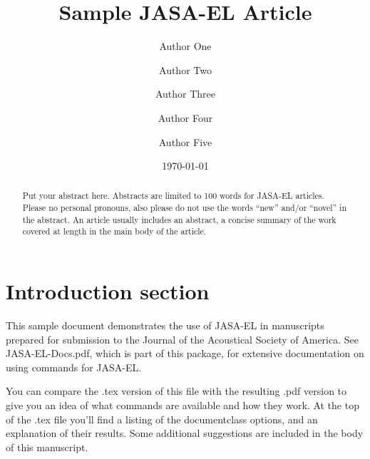 \documentclass{JASA-EL}
\begin{document}
\title[JASA-EL/Sample JASA-EL Article]{Sample JASA-EL Article}
\author{Author One}
\author{Author Two}
\author{Author Three}
\author{Author Four}
\correspondingauthor
{}
\author{Author Five}			

\date{\today} 

\begin{abstract}
Put your abstract here. Abstracts are limited to 100 words for
JASA-EL
articles. Please no
personal pronouns, also please do not use the words ``new'' and/or
``novel'' in the abstract. An article usually includes an abstract, a
concise summary of the work covered at length in the main body of the
article.     
\end{abstract}


\maketitle


\section{\label{sec:1} Introduction section}
This sample document demonstrates the use of JASA-EL in manuscripts 
prepared for submission to the Journal of the Acoustical Society of America.  
See JASA-EL-Docs.pdf, which is part of this package, for extensive
documentation on using commands for JASA-EL.

You can compare the .tex version of this file with the resulting .pdf
version to give you an idea of what  commands are available and how
they work. At the top of the .tex file you'll find a listing of the
documentclass options, and an explanation of their results.
Some additional suggestions are included in the body of this
manuscript.  
\end{document}
